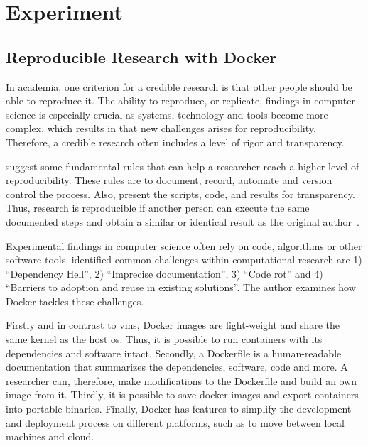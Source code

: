 \chapter{Experiment}\label{experiment}

\section{Reproducible Research with Docker}

In academia, one criterion for a credible research is that other people should be able to reproduce it.
The ability to reproduce, or replicate, findings in computer science is especially crucial as systems, technology and tools become more complex, which results in that new challenges arises for reproducibility.
Therefore, a credible research often includes a level of rigor and transparency.

\skippara \citet{sandve2013ten} suggest some fundamental rules that can help a researcher reach a higher level of reproducibility.
These rules are to document, record, automate and version control the process.
Also, present the scripts, code, and results for transparency.
Thus, research is reproducible if another person can execute the same documented steps and obtain a similar or identical result as the original author~\cite{piccolo2016tools, sandve2013ten}.

\skippara Experimental findings in computer science often rely on code, algorithms or other software tools.
\citet{boettiger2015introduction} identified common challenges within computational research are 1) ``Dependency Hell'', 2) ``Imprecise documentation'', 3) ``Code rot'' and 4) ``Barriers to adoption and reuse in existing solutions''.
The author examines how Docker tackles these challenges.

\skippara Firstly and in contrast to \gls{vm}s, Docker images are light-weight and share the same kernel as the host \gls{os}.
Thus, it is possible to run containers with its dependencies and software intact.
Secondly, a Dockerfile is a human-readable documentation that summarizes the dependencies, software, code and more.
A researcher can, therefore, make modifications to the Dockerfile and build an own image from it.
Thirdly, it is possible to save docker images and export containers into portable binaries.
Finally, Docker has features to simplify the development and deployment process on different platforms, such as to move between local machines and cloud.

%
%
\clearpage
